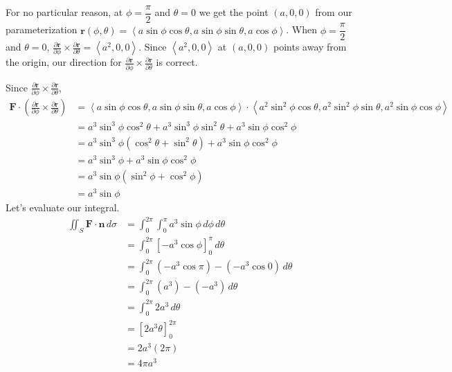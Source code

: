\documentclass{article}
\newcommand{\lrp}[1]{\left( #1 \right)}
\newcommand{\lra}[1]{\left\langle #1 \right\rangle}
\newcommand{\lrb}[1]{\left[ #1 \right]}
\renewcommand{\r}[0]{\mathbf{r}}
\newcommand{\F}[0]{\mathbf{F}}
\newcommand{\n}[0]{\mathbf{n}}
\begin{document}
For no particular reason, at $\phi = \dfrac{\pi}{2}$ and $\theta = 0$ we get the point $(a, 0, 0)$ from our parameterization $\r(\phi,\theta)=\lra{a\sin\phi\cos\theta, a\sin\phi\sin\theta, a\cos\phi}$. When $\phi = \dfrac{\pi}{2}$ and $\theta = 0$, $\displaystyle \frac{\partial \r}{\partial \phi}\times  \frac{\partial \r }{\partial \theta}=\lra{a^2,0,0}$. Since $\lra{a^2,0,0}$ at $(a, 0, 0)$ points away from the origin, our direction for $\displaystyle \frac{\partial \r}{\partial \phi}\times  \frac{\partial \r }{\partial \theta}$ is correct.
\begin{center}
\end{center}

Since $\displaystyle \frac{\partial \r}{\partial \phi}\times  \frac{\partial \r }{\partial \theta}$,
\begin{align*}
    \F \cdot \lrp{ \frac{\partial \r}{\partial \phi}\times  \frac{\partial \r }{\partial \theta}}&=\lra{a\sin\phi\cos\theta, a\sin\phi\sin\theta, a\cos\phi}\cdot \lra{a^2\sin^2\phi\cos\theta, a^2\sin^2\phi\sin\theta, a^2\sin\phi\cos\phi}\\
    &=a^3\sin^3\phi\cos^2\theta+a^3\sin^3\phi\sin^2\theta+a^3\sin\phi\cos^2\phi\\
    &=a^3\sin^3\phi\lrp{\cos^2\theta+\sin^2\theta}+a^3\sin\phi\cos^2\phi\\
    &=a^3\sin^3\phi+a^3\sin\phi\cos^2\phi\tag{$\cos^2\theta+\sin^2\theta=1$}\\
    &=a^3\sin\phi\lrp{\sin^2\phi+\cos^2\phi}\\
    &=a^3\sin\phi\tag{$\sin^2\phi+\cos^2\phi=1$}
\end{align*}
Let's evaluate our integral.
\begin{align*}
   \iint_S \F \cdot \n \,d\sigma&= \int_0^{2\pi}\int_0^\pi a^3\sin\phi\,d\phi\,d\theta\\
    &=\int_0^{2\pi}\lrb{-a^3\cos\phi}_0^\pi\,d\theta\\
    &=\int_0^{2\pi} \lrp{-a^3\cos \pi}-\lrp{-a^3\cos0 }\,d\theta\\
    &=\int_0^{2\pi}\lrp{a^3}-\lrp{-a^3}\,d\theta\\
    &=\int_0^{2\pi} 2a^3\,d\theta\\
    &=\lrb{2a^3\theta}_0^{2\pi}\\
    &=2a^3\lrp{2\pi}\\
    &=\boxed{4\pi a^3}
\end{align*}
\end{document}
